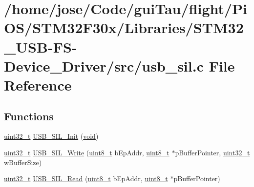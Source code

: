 \hypertarget{_s_t_m32_f30x_2_libraries_2_s_t_m32___u_s_b-_f_s-_device___driver_2src_2usb__sil_8c}{\section{/home/jose/\-Code/gui\-Tau/flight/\-Pi\-O\-S/\-S\-T\-M32\-F30x/\-Libraries/\-S\-T\-M32\-\_\-\-U\-S\-B-\/\-F\-S-\/\-Device\-\_\-\-Driver/src/usb\-\_\-sil.c File Reference}
\label{_s_t_m32_f30x_2_libraries_2_s_t_m32___u_s_b-_f_s-_device___driver_2src_2usb__sil_8c}
}
\subsection*{Functions}
\begin{DoxyCompactItemize}
\item 
\hyperlink{stdint_8h_a435d1572bf3f880d55459d9805097f62}{uint32\-\_\-t} \hyperlink{_s_t_m32_f30x_2_libraries_2_s_t_m32___u_s_b-_f_s-_device___driver_2src_2usb__sil_8c_a35769edfa7e5e32034d0c65440369cda}{U\-S\-B\-\_\-\-S\-I\-L\-\_\-\-Init} (\hyperlink{group___n_a_m_e_ga18028b8badbf1ea7e704ccac3c488e82}{void})
\item 
\hyperlink{stdint_8h_a435d1572bf3f880d55459d9805097f62}{uint32\-\_\-t} \hyperlink{_s_t_m32_f30x_2_libraries_2_s_t_m32___u_s_b-_f_s-_device___driver_2src_2usb__sil_8c_ab005324bdedc235ce1f65121467b2e72}{U\-S\-B\-\_\-\-S\-I\-L\-\_\-\-Write} (\hyperlink{stdint_8h_aba7bc1797add20fe3efdf37ced1182c5}{uint8\-\_\-t} b\-Ep\-Addr, \hyperlink{stdint_8h_aba7bc1797add20fe3efdf37ced1182c5}{uint8\-\_\-t} $\ast$p\-Buffer\-Pointer, \hyperlink{stdint_8h_a435d1572bf3f880d55459d9805097f62}{uint32\-\_\-t} w\-Buffer\-Size)
\item 
\hyperlink{stdint_8h_a435d1572bf3f880d55459d9805097f62}{uint32\-\_\-t} \hyperlink{_s_t_m32_f30x_2_libraries_2_s_t_m32___u_s_b-_f_s-_device___driver_2src_2usb__sil_8c_ab6600b124ff88cf2690b842424888629}{U\-S\-B\-\_\-\-S\-I\-L\-\_\-\-Read} (\hyperlink{stdint_8h_aba7bc1797add20fe3efdf37ced1182c5}{uint8\-\_\-t} b\-Ep\-Addr, \hyperlink{stdint_8h_aba7bc1797add20fe3efdf37ced1182c5}{uint8\-\_\-t} $\ast$p\-Buffer\-Pointer)
\end{DoxyCompactItemize}



